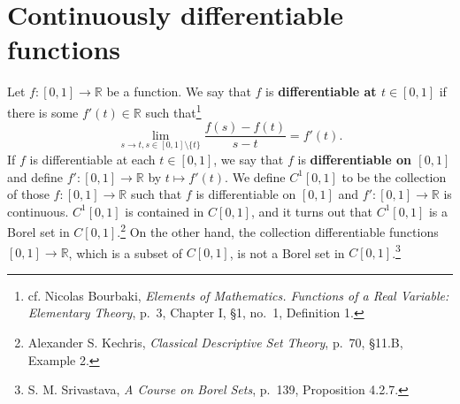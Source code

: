 \documentclass{article}
\theoremstyle{definition}
\begin{document}
\section{Continuously differentiable functions}
Let $f:[0,1] \to \mathbb{R}$ be a function. We say that $f$ is \textbf{differentiable at $t \in [0,1]$}
if  there is some $f'(t) \in \mathbb{R}$ such that\footnote{cf.
Nicolas Bourbaki, {\em Elements of Mathematics. Functions of a Real Variable: Elementary Theory},
p.~3, Chapter I, \S 1, no.~1, Definition 1.}
\[
\lim_{s \to t, s \in [0,1] \setminus \{t\}} \frac{f(s)-f(t)}{s-t} = f'(t).
\]
If $f$ is differentiable at each $t \in [0,1]$, we say that $f$ is \textbf{differentiable on $[0,1]$}
and define $f':[0,1] \to \mathbb{R}$ by $t \mapsto f'(t)$. 
We define $C^1[0,1]$ to be the collection of those $f:[0,1] \to \mathbb{R}$ such that
$f$ is differentiable on $[0,1]$ and $f':[0,1] \to \mathbb{R}$ is continuous.
$C^1[0,1]$ is contained in $C[0,1]$, and it turns out that $C^1[0,1]$ is a Borel set in $C[0,1]$.\footnote{Alexander S. Kechris, {\em Classical
Descriptive Set Theory}, p.~70, \S 11.B, Example 2.}
On the other hand, the collection differentiable functions $[0,1] \to \mathbb{R}$, which is a subset of $C[0,1]$,
 is not a Borel set in $C[0,1]$.\footnote{S. M. Srivastava, {\em A Course on Borel Sets}, p.~139, Proposition 4.2.7.}
\end{document}
